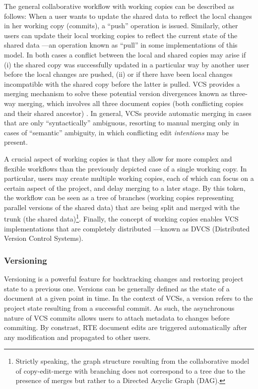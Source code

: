 \documentclass{sig-alternate}
\begin{document}
The general collaborative workflow with working copies can be described as follows:
When a user wants to update the shared data to reflect the local changes in her working copy
(commits), a ``push'' operation is issued. Similarly, other users can update their local
working copies to reflect the current state of the shared data ---an operation
known as ``pull'' in some implementations of this model.
In both cases a conflict between the local and shared copies may arise if (i) the shared
copy was successfully updated in a particular way by another user before the local changes
are pushed, (ii) or if there have been local changes incompatible with the shared copy before
the latter is pulled.
VCS provides a merging mechanism to solve these potential version divergences known as
three-way merging, which involves all three document copies (both conflicting copies and their
shared ancestor) \cite{Altmanninger2009}. In general, VCSs provide automatic merging in cases
that are only ``syntactically'' ambiguous, resorting to manual merging only in cases
of ``semantic'' ambiguity, in which conflicting edit \textit{intentions} may be present.

A crucial aspect of working copies is that they allow for more complex and flexible workflows
than the previously depicted case of a single working copy. In particular, users may create
multiple working copies, each of which can focus on a certain aspect of the project, and
delay merging to a later stage.
By this token, the workflow can be seen as a tree of branches (working copies
representing parallel versions of the shared data) that are being split and merged with
the trunk (the shared data)\footnote{
  Strictly speaking, the graph structure resulting from the collaborative model of copy-edit-merge
  with branching does not correspond to a tree due to the presence of merges but rather to a
  Directed Acyclic Graph (DAG).
}.
Finally, the concept of working copies enables VCS implementations that are completely distributed
---known as DVCS (Distributed Version Control Systems).

\subsubsection{Versioning}\label{subsec:versioning}
Versioning is a powerful feature for backtracking changes and restoring project state to a
previous one. Versions can be generally defined as the state of a document at a given point in time.
In the context of VCSs, a version refers to the project state resulting from a successful commit.
As such, the asynchronous nature of VCS commits allows users to attach metadata to changes before
commiting. By constrast, RTE document edits are triggered automatically after any modification and
propagated to other users.
\end{document}
